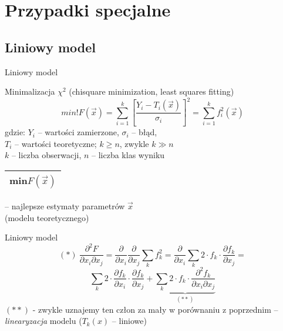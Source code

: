 \section{Przypadki specjalne}

\subsection{Liniowy model}
  \begin{frame}{Liniowy model}
    \begin{block}{Minimalizacja $\chi^{2}$ (chisquare minimization, least squares fitting)}
      \begin{displaymath}
        min!F(\vec{x}) = \sum_{i=1}^{k} \left[ \frac{Y_{i} - T_{i}(\vec{x})}{\sigma_{i}} \right]^{2} = \sum_{i=1}^{k} f_{i}^{2}(\vec{x})
      \end{displaymath}
      gdzie: $Y_{i}$ -- wartości zamierzone, $\sigma_{i}$ -- błąd,\\
      $T_{i}$ -- wartości teoretyczne; $k \geq n$, zwykle $k \gg n$ \\
      $k$ -- liczba obserwacji, $n$ -- liczba klas wyniku\\
      \begin{tabular}{|c|} \hline
        min$F(\vec{x})$ \\ \hline
      \end{tabular}
      -- najlepsze estymaty parametrów $\vec{x}$\\
      (modelu teoretycznego)
    \end{block}

  \end{frame}

  \begin{frame}{Liniowy model}
    \begin{equation}
      (*)\ \frac{\partial^2 F}{\partial x_{i} \partial x_{j}} =
      \frac{\partial}{\partial x_{i}} \frac{\partial}{\partial x_{j}}
      \sum_{k} f_{k}^2 = \frac{\partial}{\partial x_{i}}
      \sum_{k} 2 \cdot f_{k} \cdot \frac{\partial f_{k}}{\partial x_{j}} =
      \nonumber
    \end{equation}
    \begin{equation}
      \sum_{k} 2 \cdot \frac{\partial f_{k}}{\partial x_{i}} \cdot
      \frac{\partial f_{k}}{\partial x_{j}} +
      \underbrace{
        \sum_{k} 2 \cdot f_{k} \cdot
        \frac{\partial^2 f_{k}}{\partial x_{i} \partial x_{j}}
      }_{(**)}
      \nonumber
    \end{equation}
    $(**)$ - zwykle uznajemy ten człon za mały w porównaniu
    z poprzednim -- \emph{linearyzacja} modelu ($T_{k}(x)$ -- liniowe)
  \end{frame}

